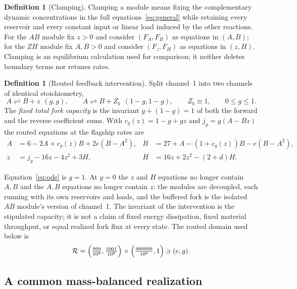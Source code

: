 \documentclass[11pt,a4paper]{article}
\theoremstyle{plain}
\theoremstyle{definition}
\newtheorem{definition}[theorem]{Definition}
\theoremstyle{remark}
\newcommand{\Rr}{\mathcal{R}}
\begin{document}
\begin{definition}[Clamping]
Clamping a module means fixing the complementary dynamic concentrations in the full equations~\eqref{eq:general} while retaining every reservoir and every constant input or linear load induced by the other reactions. For the $AB$ module fix $z>0$ and consider $(F_A,F_B)$ as equations in $(A,B)$; for the $ZH$ module fix $A,B>0$ and consider $(F_z,F_H)$ as equations in $(z,H)$. Clamping is an equilibrium calculation used for comparison; it neither deletes boundary terms nor retunes rates.
\end{definition}

\begin{definition}[Routed feedback intervention]
Split channel~1 into two channels of identical stoichiometry,
\begin{equation}\label{eq:routing}
A\rightleftharpoons B+z\ \ (g,g),\qquad A\rightleftharpoons B+Z_b\ \ (1-g,1-g),\qquad Z_b\equiv1,\qquad 0\le g\le1 .
\end{equation}
The \emph{fixed total fork capacity} is the invariant $g+(1-g)=1$ of both the forward and the reverse coefficient sums. With $c_g(z)=1-g+gz$ and $j_g=g(A-Bz)$ the routed equations at the flagship rates are
\begin{equation}\label{eq:routed}
\begin{aligned}
\dot A&=6-2A+c_g(z)B+2e(B-A^2),& \dot B&=27+A-(1+c_g(z))B-e(B-A^2),\\
\dot z&=j_g-16z-4z^2+3H,& \dot H&=16z+2z^2-(2+d)H.
\end{aligned}
\end{equation}
\end{definition}

Equation~\eqref{eq:ode} is $g=1$. At $g=0$ the $z$ and $H$ equations no longer contain $A,B$ and the $A,B$ equations no longer contain $z$: the modules are decoupled, each running with its own reservoirs and loads, and the buffered fork is the isolated $AB$ module's version of channel~1. The invariant of the intervention is the stipulated capacity; it is not a claim of fixed energy dissipation, fixed material throughput, or equal realized fork flux at every state. The routed domain used below is
\begin{equation}\label{eq:domains}
\Rr=\Bigl(\tfrac{999}{10^8},\tfrac{1001}{10^8}\Bigr)\times\Bigl(\tfrac{999999}{10^6},1\Bigr)\ni(e,g).
\end{equation}

\subsection{A common mass-balanced realization}\label{sec:thermo}
\end{document}
